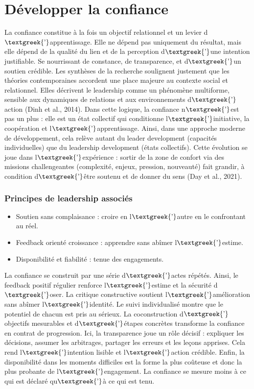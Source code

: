 \documentclass{article}
\begin{document}
\section{Développer la confiance}
La confiance constitue à la fois un objectif relationnel et un levier d$\text{\textgreek{’}}$apprentissage. Elle ne
dépend pas uniquement du résultat, mais elle dépend de la qualité du lien et de la perception
d$\text{\textgreek{’}}$une intention justifiable. Se nourrissant de constance, de transparence, et
d$\text{\textgreek{’}}$un soutien crédible. Les synthèses de la recherche soulignent justement que les théories
contemporaines accordent une place majeure au contexte social et relationnel. Elles décrivent le leadership comme un
phénomène multiforme, sensible aux dynamiques de relations et aux environnements d$\text{\textgreek{’}}$action
\label{ref:RNDrhGpnvSF8o}(Dinh et al., 2014). Dans cette logique, la confiance n$\text{\textgreek{’}}$est pas un plus :
elle est un état collectif qui conditionne l$\text{\textgreek{’}}$initiative, la coopération et
l$\text{\textgreek{’}}$apprentissage. Ainsi, dans une approche moderne de développement, cela relève autant du leader
development (capacités individuelles) que du leadership development (états collectifs). Cette évolution se joue dans
l$\text{\textgreek{’}}$expérience : sortir de la zone de confort via des missions challengeantes (complexité, enjeux,
pression, nouveauté) fait grandir, à condition d$\text{\textgreek{’}}$être soutenu et de donner du sens
\label{ref:RNDxkLVNbumpB}(Day et al., 2021).

\subsubsection{Principes de leadership associés}
\begin{itemize}
\item Soutien sans complaisance : croire en l$\text{\textgreek{’}}$autre en le confrontant au réel.
\item Feedback orienté croissance : apprendre sans abîmer l$\text{\textgreek{’}}$estime.
\item Disponibilité et fiabilité : tenue des engagements.
\end{itemize}
La confiance se construit par une série d$\text{\textgreek{’}}$actes répétés. Ainsi, le feedback positif régulier
renforce l$\text{\textgreek{’}}$estime et la sécurité d$\text{\textgreek{’}}$oser. La critique constructive soutient
l$\text{\textgreek{’}}$amélioration sans abîmer l$\text{\textgreek{’}}$identité. Le suivi individualisé montre que le
potentiel de chacun est pris au sérieux. La coconstruction d$\text{\textgreek{’}}$objectifs mesurables et
d$\text{\textgreek{’}}$étapes concrètes transforme la confiance en contrat de progression. Ici, la transparence joue un
rôle décisif : expliquer les décisions, assumer les arbitrages, partager les erreurs et les leçons apprises. Cela rend
l$\text{\textgreek{’}}$intention lisible et l$\text{\textgreek{’}}$action crédible. Enfin, la disponibilité dans les
moments difficiles est la forme la plus coûteuse et donc la plus probante de l$\text{\textgreek{’}}$engagement. La
confiance se mesure moins à ce qui est déclaré qu$\text{\textgreek{’}}$à ce qui est tenu.
\end{document}
